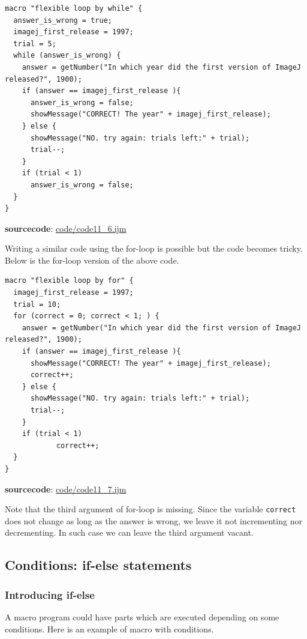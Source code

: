 \documentclass[11pt,a4paper,oneside]{report}
\newcommand{\ilcom}[1]{\texttt{\small#1}}
\begin{document}
\begin{lstlisting}[morekeywords={*, while}]
macro "flexible loop by while" {
  answer_is_wrong = true;
  imagej_first_release = 1997;
  trial = 5;
  while (answer_is_wrong) {
    answer = getNumber("In which year did the first version of ImageJ released?", 1900);
    if (answer == imagej_first_release ){
      answer_is_wrong = false;
      showMessage("CORRECT! The year" + imagej_first_release);		
    } else {
      showMessage("NO. try again: trials left:" + trial);
      trial--;
    }
    if (trial < 1)
      answer_is_wrong = false;
  }
}
\end{lstlisting}
\textbf{sourcecode}: \href{http://www.example.com/contents}{code/code11\_6.ijm}

Writing a similar code using the for-loop is possible but the code becomes tricky.
Below is the for-loop version of the above code.  


\begin{lstlisting}[morekeywords={*, for}]
macro "flexible loop by for" {
  imagej_first_release = 1997;
  trial = 10;
  for (correct = 0; correct < 1; ) {
    answer = getNumber("In which year did the first version of ImageJ released?", 1900);
    if (answer == imagej_first_release ){
      showMessage("CORRECT! The year" + imagej_first_release);		
      correct++;
    } else {
      showMessage("NO. try again: trials left:" + trial);
      trial--;
    }
    if (trial < 1)
            correct++;
  }
}

\end{lstlisting}
\textbf{sourcecode}: \href{http://www.example.com/contents}{code/code11\_7.ijm}

Note that the third argument of for-loop is missing. Since the variable
\ilcom{correct} does not change as long as the answer is wrong, we leave it not
incrementing nor decrementing. In such case we can leave the third argument
vacant. 

\subsection{Conditions: if-else statements}
\subsubsection{Introducing if-else}
A macro program could have parts which are executed depending on some
conditions.
Here is an example of macro with conditions.
\end{document}
